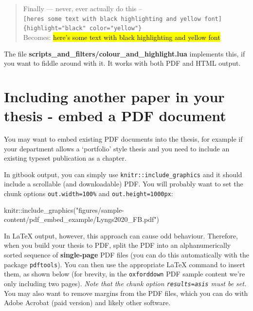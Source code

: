 \documentclass[a4paper, twoside]{templates/ociamthesis}
\newenvironment{Shaded}{\begin{snugshade}}{\end{snugshade}}
\newcommand{\FunctionTok}[1]{\textcolor[rgb]{0.00,0.00,0.00}{#1}}
\newcommand{\NormalTok}[1]{#1}
\newcommand{\SpecialCharTok}[1]{\textcolor[rgb]{0.00,0.00,0.00}{#1}}
\newcommand{\StringTok}[1]{\textcolor[rgb]{0.31,0.60,0.02}{#1}}
\renewenvironment{Shaded}
{
  \vspace{10pt}%
  \begin{snugshade}%
}{%
  \end{snugshade}%
  \vspace{8pt}%
}
\begin{document}
\begin{quote}
Finally --- never, ever actually do this -- \texttt{{[}here\textquotesingle{}s\ some\ text\ with\ black\ highlighting\ and\ yellow\ font{]}\{highlight="black"\ color="yellow"\}}\\
Becomes: \textcolor{yellow}{\hl{here's some text with black highlighting and yellow font}}
\end{quote}

The file \textbf{scripts\_and\_filters/colour\_and\_highlight.lua} implements this, if you want to fiddle around with it.
It works with both PDF and HTML output.

\hypertarget{embed-pdf}{%
\section{Including another paper in your thesis - embed a PDF document}\label{embed-pdf}}

You may want to embed existing PDF documents into the thesis, for example if your department allows a `portfolio' style thesis and you need to include an existing typeset publication as a chapter.

In gitbook output, you can simply use \texttt{knitr::include\_graphics} and it should include a scrollable (and downloadable) PDF.
You will probably want to set the chunk options \texttt{out.width=\textquotesingle{}100\%\textquotesingle{}} and \texttt{out.height=\textquotesingle{}1000px\textquotesingle{}}:

\begin{Shaded}
\begin{Highlighting}[]
\NormalTok{knitr}\SpecialCharTok{::}\FunctionTok{include\_graphics}\NormalTok{(}\StringTok{"figures/sample{-}content/pdf\_embed\_example/Lyngs2020\_FB.pdf"}\NormalTok{)}
\end{Highlighting}
\end{Shaded}

In LaTeX output, however, this approach can cause odd behaviour.
Therefore, when you build your thesis to PDF, split the PDF into an alphanumerically sorted sequence of \textbf{single-page} PDF files (you can do this automatically with the package \texttt{pdftools}). You can then use the appropriate LaTeX command to insert them, as shown below (for brevity, in the \texttt{oxforddown} PDF sample content we're only including two pages).
\emph{Note that the chunk option \texttt{results=\textquotesingle{}asis\textquotesingle{}} must be set.}
You may also want to remove margins from the PDF files, which you can do with Adobe Acrobat (paid version) and likely other software.
\end{document}
